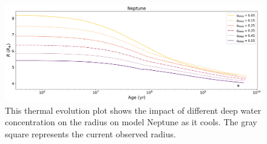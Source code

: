 \documentclass[11pt]{ucscthesisbs}
\begin{document}
\begin{figure}[ht]
 \centerline{
  \includegraphics[scale=0.45]{figures/n_cooling_radius_nz_4096_logx.png}
 }
\caption[Thermal Evolution Curves for Neptune - Radius]
{This thermal evolution plot shows the impact of different deep water concentration on the radius on model Neptune as it cools. The gray square represents the current observed radius.}
\label{fig:evolve_neptune_radius}
\end{figure}
\end{document}
